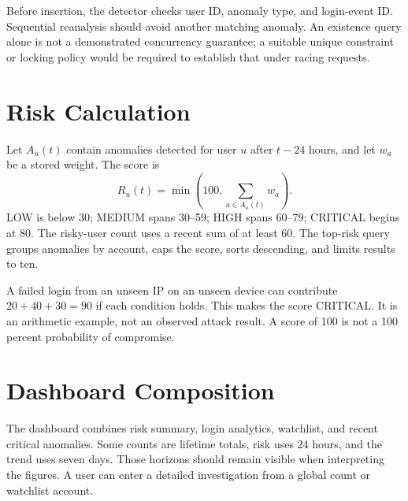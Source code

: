 Before insertion, the detector checks user ID, anomaly type, and login-event ID. Sequential reanalysis should avoid another matching anomaly. An existence query alone is not a demonstrated concurrency guarantee; a suitable unique constraint or locking policy would be required to establish that under racing requests.

\section{Risk Calculation}
Let $A_u(t)$ contain anomalies detected for user $u$ after $t-24$ hours, and let $w_a$ be a stored weight. The score is
\begin{equation}R_u(t)=\min\left(100,\sum_{a\in A_u(t)}w_a\right).\end{equation}
LOW is below 30; MEDIUM spans 30--59; HIGH spans 60--79; CRITICAL begins at 80. The risky-user count uses a recent sum of at least 60. The top-risk query groups anomalies by account, caps the score, sorts descending, and limits results to ten.

A failed login from an unseen IP on an unseen device can contribute $20+40+30=90$ if each condition holds. This makes the score CRITICAL. It is an arithmetic example, not an observed attack result. A score of 100 is not a 100 percent probability of compromise.

\section{Dashboard Composition}
The dashboard combines risk summary, login analytics, watchlist, and recent critical anomalies. Some counts are lifetime totals, risk uses 24 hours, and the trend uses seven days. Those horizons should remain visible when interpreting the figures. A user can enter a detailed investigation from a global count or watchlist account.

